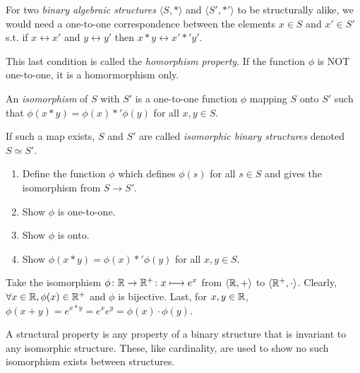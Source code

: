 \begin{definition}
    For two \emph{binary algebraic structures} $\langle S, * \rangle$ and $\langle S', *' \rangle$ to be structurally alike, we would need a one-to-one correspondence between the elements $x \in S$ and $x' \in S'$ s.t. if $x \leftrightarrow x'$ and $y \leftrightarrow y'$ then $x*y \leftrightarrow x'*'y'$.
\end{definition}
\begin{remark}
    This last condition is called the \emph{homorphism property}. If the function $\phi$ is NOT one-to-one, it is a homormorphism only. 
\end{remark}
\begin{definition}[Isomorphism]
    An \emph{isomorphism} of $S$ with $S'$ is a one-to-one function $\phi$ mapping $S$ onto $S'$ such that $\phi(x*y) = \phi(x) *' \phi(y)$ for all $x,y \in S$. 

    If such a map exists, $S$ and $S'$ are called \emph{isomorphic binary structures} denoted $S \simeq S'$.
\end{definition}
\begin{note}
    \leavevmode
    \begin{enumerate}[label=(Step \arabic*), leftmargin=*]
        \item Define the function $\phi$ which defines $\phi(s)$ for all $s \in S$ and gives the isomorphism from $S \to S'$.
        \item Show $\phi$ is one-to-one.
        \item Show $\phi$ is onto.
        \item Show $\phi(x*y) = \phi(x)*'\phi(y)$ for all $x,y \in S$.
    \end{enumerate}
\end{note}
\begin{example}
    Take the isomorphism $\phi\colon\mathbb{R}\to\mathbb{R}^+\colon x\longmapsto e^x$ from $\langle \mathbb{R}, +\rangle$ to $\langle \mathbb{R}^+, \cdot \rangle$. Clearly, $\forall x \in \mathbb{R}, \phi(x) \in \mathbb{R}^+$ and $\phi$ is bijective. Last, for $x,y \in \mathbb{R}$, $\phi(x + y) = e^{x*y} = e^xe^y = \phi(x)\cdot\phi(y)$.
\end{example}
\begin{definition}
    A structural property is any property of a binary structure that is invariant to any isomorphic structure. These, like cardinality, are used to show no such isomorphism exists between structures.
\end{definition}
